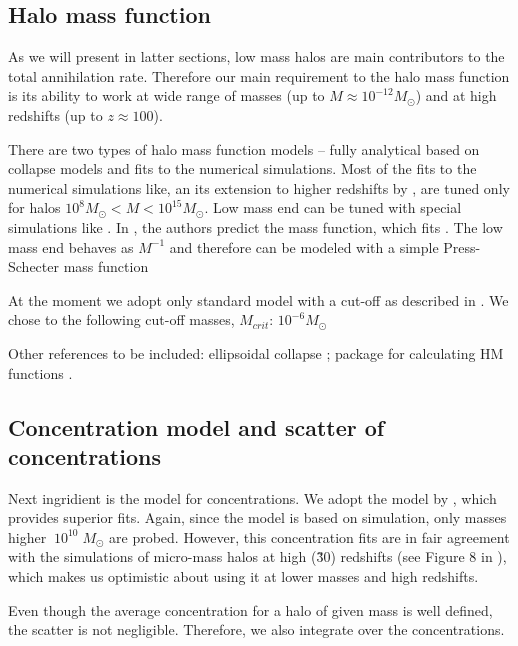 \subsection{Halo mass function}

As we will present in latter sections, low mass halos are main contributors to the total annihilation rate. Therefore our main requirement to the halo mass function is its ability to work at wide range of masses (up to $M \approx 10^{-12}M_\odot$) and at high redshifts (up to $z \approx 100$). 

There are two types of halo mass function models -- fully analytical based on collapse models and fits to the numerical simulations. Most of the fits to the numerical simulations like, \citet{Tinker_2008} an its extension to higher redshifts by \citet{Behroozi_2013}, are tuned only for halos $10^{8}M_\odot < M < 10^{15}M_\odot$. Low mass end can be tuned with special simulations like \cite{Diemand_2005}. In \cite{Schneider_2013}, the authors predict the mass function, which fits \cite{Diemand_2005}. The low mass end behaves as $M^{-1}$ and therefore can be modeled with a simple Press-Schecter mass function \citep{Press_1974}

At the moment we adopt only standard \citet{Press_1974} model with a cut-off as described in \cite{Diemand_2005}. We chose to the following cut-off masses, $M_{crit}$: $10^{-6}M_\odot$

Other references to be included:
ellipsoidal collapse \citep{Sheth_2001}; package for calculating HM functions \cite{Murray_2013}.

\subsection{Concentration model and scatter of concentrations}

Next ingridient is the model for concentrations. We adopt the model by \cite{2014arXiv1407.4730D}, which provides superior fits. Again, since the model is based on simulation, only masses higher $~10^{10}\;M_\odot$ are probed. However, this concentration fits are in fair agreement with the simulations of micro-mass halos at high (\~30) redshifts (see Figure 8 in \cite{2014arXiv1407.4730D}), which makes us optimistic about using it at lower masses and high redshifts.

Even though the average concentration for a halo of given mass is well defined, the scatter is not negligible. Therefore, we also integrate over the concentrations.

